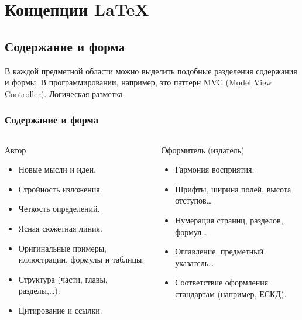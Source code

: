 \section{Концепции \LaTeX}


\subsection{Содержание и форма}


В каждой предметной области можно выделить подобные разделения содержания и формы. В программировании, например, это паттерн MVC (Model View Controller). Логическая разметка


\begin{frame}
\frametitle{Содержание и форма}
    \begin{columns}
            \begin{block}{Автор}
                \begin{itemize}
                    \item Новые мысли и идеи.
                    \item Стройность изложения.
                    \item Четкость определений.
                    \item Ясная сюжетная линия.
                    \item Оригинальные примеры, иллюстрации, формулы и таблицы.
                    \item Структура (части, главы, разделы,\ldots).
                    \item Цитирование и ссылки.
                \end{itemize}
            \end{block}
        
            \begin{block}{Оформитель (издатель)}
                \begin{itemize}
                    \item Гармония восприятия.
                    \item Шрифты, ширина полей, высота отступов\ldots
                    \item Нумерация страниц, разделов, формул\ldots
                    \item Оглавление, предметный указатель\ldots
                    \item Соответствие оформления стандартам (например, ЕСКД).
                \end{itemize}
            \end{block}
    \end{columns}
\end{frame}


